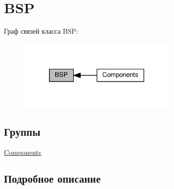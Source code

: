 \hypertarget{group___b_s_p}{}\section{B\+SP}
\label{group___b_s_p}
Граф связей класса B\+SP\+:
\nopagebreak
\begin{figure}[H]
\begin{center}
\leavevmode
\includegraphics[width=225pt]{group___b_s_p}
\end{center}
\end{figure}
\subsection*{Группы}
\begin{DoxyCompactItemize}
\item 
\hyperlink{group___components}{Components}
\end{DoxyCompactItemize}


\subsection{Подробное описание}

